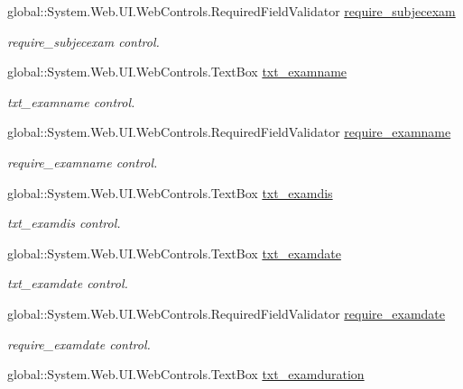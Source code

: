 \begin{DoxyCompactItemize}
global\+::\+System.\+Web.\+U\+I.\+Web\+Controls.\+Required\+Field\+Validator \mbox{\hyperlink{class_admin__exam_af92123406142c5433f3e74c11927061d}{require\+\_\+subjecexam}}
\begin{DoxyCompactList}\small\item\em require\+\_\+subjecexam control. \end{DoxyCompactList}\item 
global\+::\+System.\+Web.\+U\+I.\+Web\+Controls.\+Text\+Box \mbox{\hyperlink{class_admin__exam_a772d0b25d58e29126cf44b81f2a2f469}{txt\+\_\+examname}}
\begin{DoxyCompactList}\small\item\em txt\+\_\+examname control. \end{DoxyCompactList}\item 
global\+::\+System.\+Web.\+U\+I.\+Web\+Controls.\+Required\+Field\+Validator \mbox{\hyperlink{class_admin__exam_a8b0e6a4826f0059248af77c18984ed8d}{require\+\_\+examname}}
\begin{DoxyCompactList}\small\item\em require\+\_\+examname control. \end{DoxyCompactList}\item 
global\+::\+System.\+Web.\+U\+I.\+Web\+Controls.\+Text\+Box \mbox{\hyperlink{class_admin__exam_a0bbe28c9708463e422886cc122f6ddb0}{txt\+\_\+examdis}}
\begin{DoxyCompactList}\small\item\em txt\+\_\+examdis control. \end{DoxyCompactList}\item 
global\+::\+System.\+Web.\+U\+I.\+Web\+Controls.\+Text\+Box \mbox{\hyperlink{class_admin__exam_aa5245c103c34f1d91c483f0a7f720d66}{txt\+\_\+examdate}}
\begin{DoxyCompactList}\small\item\em txt\+\_\+examdate control. \end{DoxyCompactList}\item 
global\+::\+System.\+Web.\+U\+I.\+Web\+Controls.\+Required\+Field\+Validator \mbox{\hyperlink{class_admin__exam_ad434173b5922eb147ea490d8817bbc6c}{require\+\_\+examdate}}
\begin{DoxyCompactList}\small\item\em require\+\_\+examdate control. \end{DoxyCompactList}\item 
global\+::\+System.\+Web.\+U\+I.\+Web\+Controls.\+Text\+Box \mbox{\hyperlink{class_admin__exam_a901c430fc370e8e2c58896b93dae29c3}{txt\+\_\+examduration}}

\end{DoxyCompactItemize}
